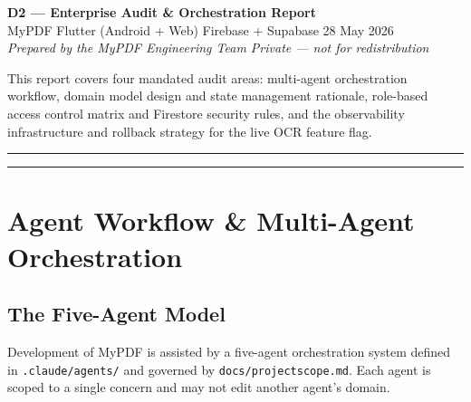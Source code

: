 \documentclass[11pt,a4paper]{article}
\begin{document}
\thispagestyle{fancy}
\begin{center}
  {\LARGE\bfseries\color{accent} D2 — Enterprise Audit \& Orchestration Report}\\[6pt]
  {\normalsize MyPDF \textbullet{} Flutter (Android + Web) \textbullet{} Firebase + Supabase \textbullet{} 28 May 2026}\\[4pt]
  {\small\itshape Prepared by the MyPDF Engineering Team \textbullet{} Private — not for redistribution}
\end{center}
\vspace{2pt}
{\small This report covers four mandated audit areas: multi-agent orchestration workflow,
domain model design and state management rationale, role-based access control matrix
and Firestore security rules, and the observability infrastructure and rollback strategy
for the live OCR feature flag.}
\vspace{8pt}
\hrule
\vspace{4pt}

\tableofcontents
\vspace{6pt}
\hrule

\section{Agent Workflow \& Multi-Agent Orchestration}

\subsection{The Five-Agent Model}

Development of MyPDF is assisted by a five-agent orchestration system defined in
\texttt{.claude/agents/} and governed by \texttt{docs/projectscope.md}.
Each agent is scoped to a single concern and may not edit another agent's domain.
\end{document}
